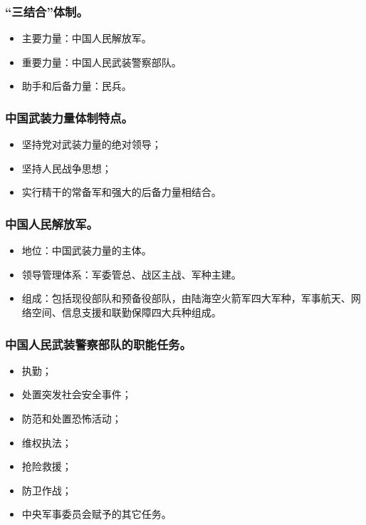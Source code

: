 \documentclass{article}
\begin{document}
\subsubsection{“三结合”体制。}
\begin{itemize}
    \item 主要力量：中国人民解放军。
    \item 重要力量：中国人民武装警察部队。
    \item 助手和后备力量：民兵。
\end{itemize}

\subsubsection{中国武装力量体制特点。}
\begin{itemize}
    \item 坚持党对武装力量的绝对领导；
    \item 坚持人民战争思想；
    \item 实行精干的常备军和强大的后备力量相结合。
\end{itemize}

\subsubsection{中国人民解放军。}
\begin{itemize}
    \item 地位：中国武装力量的主体。
    \item 领导管理体系：军委管总、战区主战、军种主建。
    \item 组成：包括现役部队和预备役部队，由陆海空火箭军四大军种，军事航天、网络空间、信息支援和联勤保障四大兵种组成。
\end{itemize}

\subsubsection{中国人民武装警察部队的职能任务。}
\begin{itemize}
    \item 执勤；
    \item 处置突发社会安全事件；
    \item 防范和处置恐怖活动；
    \item 维权执法；
    \item 抢险救援；
    \item 防卫作战；
    \item 中央军事委员会赋予的其它任务。
\end{itemize}
\end{document}
